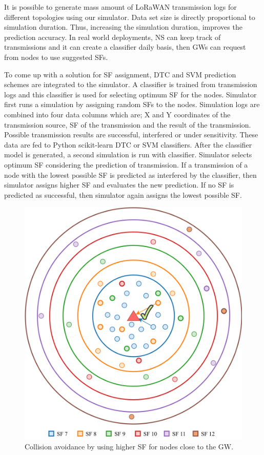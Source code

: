 \documentclass[conference]{IEEEtran}
\begin{document}
\par It is possible to generate mass amount of LoRaWAN transmission logs for different topologies using our simulator. Data set size is directly proportional to simulation duration. Thus, increasing the simulation duration, improves the prediction accuracy. In real world deployments, NS can keep track of  transmissions and it can create a classifier daily basis, then GWs can request from nodes to use suggested SFs.

\par To come up with a solution for SF assignment, DTC and SVM prediction schemes are integrated to the simulator. A classifier is trained from transmission logs and this classifier is used for selecting optimum SF for the nodes. Simulator first runs a simulation by assigning random SFs to the nodes. Simulation logs are combined into four data columns which are; X and Y coordinates of the transmission source, SF of the transmission and the result of the transmission. Possible transmission results are successful, interfered or under sensitivity. These data are fed to Python scikit-learn DTC or SVM classifiers. After the classifier model is generated, a second simulation is run with classifier. Simulator selects optimum SF considering the prediction of transmission. If a transmission of a node with the lowest possible SF is predicted as interfered by the classifier, then simulator assigns higher SF and evaluates the new prediction. If no SF is predicted as successful, then simulator again assigns the lowest possible SF.

\begin{figure}
\centering
\includegraphics[width=\linewidth]{collision_solution_single_gw}
\caption{Collision avoidance by using higher SF for nodes close to the GW.}
\label{fig:collision_solution_single_gw}
\end{figure}
\end{document}
